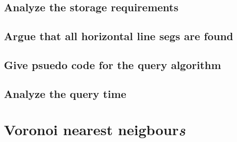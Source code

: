 \documentclass{article}
\begin{document}
\subsection{Analyze the storage requirements}
\subsection{Argue that all horizontal line segs are found}
\subsection{Give psuedo code for the query algorithm}
\subsection{Analyze the query time}
\section{Voronoi nearest neigbour\emph{s}}
\end{document}
